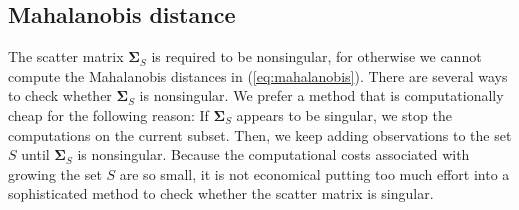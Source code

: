 \documentclass[a4paper,oneside,11pt,DIV=12]{scrartcl}
\begin{document}
\subsection{Mahalanobis distance}
The scatter matrix $\bm \Sigma_S$ is required to be nonsingular, for otherwise we cannot compute the Mahalanobis distances in (\ref{eq:mahalanobis}). There are several ways to check whether $\bm \Sigma_S$ is nonsingular. We prefer a method that is computationally cheap for the following reason: If $\bm \Sigma_S$ appears to be singular, we stop the computations on the current subset. Then, we keep adding observations to the set $S$ until $\bm \Sigma_S$ is nonsingular. Because the computational costs associated with growing the set $S$ are so small, it is not economical putting too much effort into a sophisticated method to check whether the scatter matrix is singular. 
\end{document}
